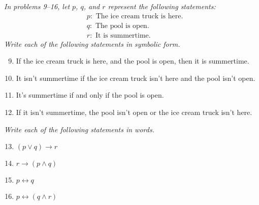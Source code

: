 \emph{In problems 9--16, let $p$, $q$, and $r$ represent the following statements:}
\begin{align*}
&p: \textrm{ The ice cream truck is here.}\\
&q: \textrm{ The pool is open.}\\
&r: \textrm{ It is summertime.}
\end{align*}
\emph{Write each of the following statements in symbolic form.}
\begin{enumerate}
\setcounter{enumi}{8}

\item If the ice cream truck is here, and the pool is open, then it is summertime. 

\item It isn't summertime if the ice cream truck isn't here and the pool isn't open. 

\item It's summertime if and only if the pool is open. 

\item If it isn't summertime, the pool isn't open or the ice cream truck isn't here. 
\end{enumerate}

\emph{Write each of the following statements in words.}
\begin{enumerate}
\setcounter{enumi}{12}

\item $(p \vee q) \to r$ 

\item $r \to (p \wedge q)$ 

\item $p \leftrightarrow q$ 

\item $p \leftrightarrow (q \wedge r)$ 
\end{enumerate}


